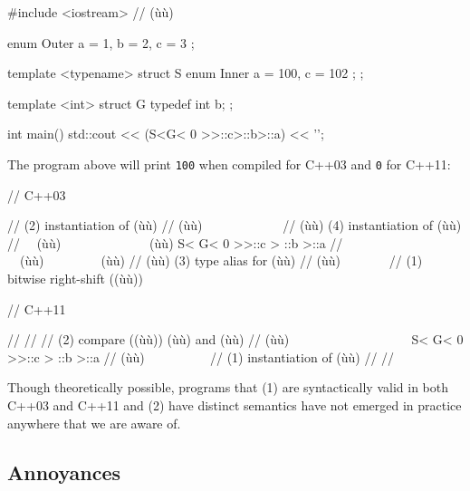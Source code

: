 \begin{emcppshiddenlisting}[emcppsbatch=e4]
#include <iostream>    // (ù{}ù)
\end{emcppshiddenlisting}
\begin{emcppslisting}[emcppsbatch=e4]
enum Outer { a = 1, b = 2, c = 3 };

template <typename> struct S
{
    enum Inner { a = 100, c = 102 };
};

template <int> struct G
{
    typedef int b;
};

int main()
{
    std::cout << (S<G< 0 >>::c>::b>::a) << '\n';
}
\end{emcppslisting}

\noindent The program above will print \lstinline!100! when compiled for C++03 and
\lstinline!0! for C++11:

\begin{emcppslisting}[emcppsignore={Pathological}]
// C++03

//     (2) instantiation of (ù{}ù)
//    (ù{\codeincomments{$\|$}}ù)~~~~~~~~~~~~
//    (ù{\codeincomments{$\|\:\,|\:\,\|$}}ù)   (4) instantiation of (ù{}ù)
//  ~~(ù{\codeincomments{$\|\downarrow\|$}}ù)~~~~~~~~~~~~~~(ù{\codeincomments{$\downarrow$}}ù)
    S< G< 0 >>::c > ::b >::a
//    ~~(ù{\codeincomments{$\|\,\,\uparrow\,\,\|$}}ù)~~~~~~~~~(ù{\codeincomments{$\uparrow$}}ù)
//      (ù{\codeincomments{$\|\:\,\,\,|\:\,\,\,\|$}}ù) (3) type alias for (ù{}ù)
//      (ù{\codeincomments{$\|$}}ù)~~~~~~~
// (1) bitwise right-shift ((ù{}ù))
\end{emcppslisting}


\begin{emcppslisting}[emcppsignore={Pathological}]
// C++11

//
//
//  (2) compare ((ù{\codeincomments{>}}ù)) (ù{}ù) and (ù{}ù)
//  (ù{\codeincomments{$\downarrow$}}ù) ~~~~~~~~~~~~~~~~~~
    S< G< 0 >>::c > ::b >::a
//  (ù{\codeincomments{$\uparrow$}}ù) ~~~~~~~~~
//  (1) instantiation of (ù{}ù)
//
//
\end{emcppslisting}

\pagebreak[4]%
\noindent Though theoretically possible, programs that (1) are syntactically valid
in both C++03 and C++11 and (2) have distinct semantics have not
emerged in practice anywhere that we are aware of.

\subsection[Annoyances]{Annoyances}\label{annoyances}

